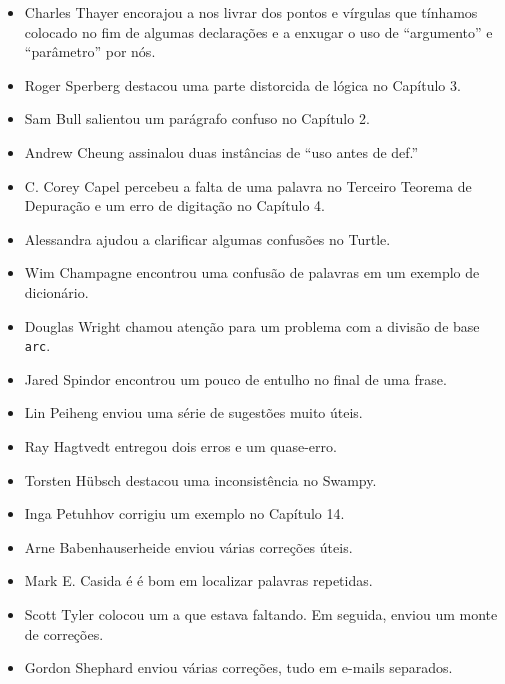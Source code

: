\documentclass[10pt]{book}
\begin{document}
\begin {itemize}
\item Charles Thayer encorajou a nos livrar dos pontos e vírgulas
que tínhamos colocado no fim de algumas declarações e a enxugar o
uso de ``argumento'' e ``parâmetro'' por nós.

\item Roger Sperberg destacou uma parte distorcida de lógica no Capítulo 3.

\item Sam Bull salientou um parágrafo confuso no Capítulo 2.

\item Andrew Cheung assinalou duas instâncias de ``uso antes de def.''

\item C. Corey Capel percebeu a falta de uma palavra no Terceiro Teorema
de Depuração e um erro de digitação no Capítulo 4.

\item Alessandra ajudou a clarificar algumas confusões no Turtle.

\item Wim Champagne encontrou uma confusão de palavras em um exemplo de dicionário.

\item Douglas Wright chamou atenção para um problema com a divisão de base
{\tt arc}.

\item Jared Spindor encontrou um pouco de entulho no final de uma frase.

\item Lin Peiheng enviou uma série de sugestões muito úteis.

\item Ray Hagtvedt entregou dois erros e um quase-erro.

\item Torsten H\"{u}bsch destacou uma inconsistência no Swampy.

\item Inga Petuhhov corrigiu um exemplo no Capítulo 14.

\item Arne Babenhauserheide enviou várias correções úteis.

\item Mark E. Casida é é bom em localizar palavras repetidas.

\item Scott Tyler colocou um a que estava faltando. Em seguida, enviou
um monte de correções.

\item Gordon Shephard enviou várias correções, tudo em e-mails
separados.


\end{itemize}
\end{document}
